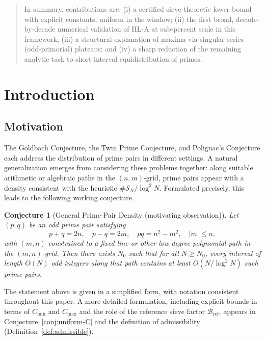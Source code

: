 \documentclass[11pt]{article}
\theoremstyle{inline}
\theoremstyle{break}
\theoremstyle{break}
\theoremstyle{break}
\theoremstyle{break}
\theoremstyle{break}
\newtheorem{conjecture}{Conjecture}
\theoremstyle{break}
\theoremstyle{break}
\theoremstyle{inline}
\newcommand{\tref}{{\scriptscriptstyle\mathrm{ref}}}
\newcommand{\Cmeas}{C}              %
\newcommand{\Bref}{\mathcal{B}_\tref}
\begin{document}
\begin{abstract}
In summary, contributions are: (i) a certified sieve-theoretic lower bound with explicit constants, uniform in the window; (ii) the first broad, decade-by-decade numerical validation of HL-A at sub-percent scale in this framework; (iii) a structural explanation of maxima via singular-series (odd-primorial) plateaus; and (iv) a sharp reduction of the remaining analytic task to short-interval equidistribution of primes.
\end{abstract}


\section{Introduction}

\subsection{Motivation}
The Goldbach Conjecture, the Twin Prime Conjecture, and Polignac’s Conjecture each address the distribution of prime pairs in different settings.  
A natural generalization emerges from considering these problems together: along suitable arithmetic or algebraic paths in the \( (n,m) \)-grid, prime pairs appear with a density consistent with the heuristic \( \#\mathcal{S}_N / \log^2 N \).  
Formulated precisely, this leads to the following working conjecture.

\begin{conjecture}[General Prime-Pair Density (motivating observation)]\label{conj:gppd}
Let \( (p,q) \) be an odd prime pair satisfying
\begin{equation}
p+q = 2n,\quad p-q = 2m,\quad pq = n^2 - m^2,\quad |m| \le n,
\end{equation}
with \( (m,n) \) constrained to a fixed line or other low-degree polynomial path in the \( (m,n) \)-grid.  
Then there exists \( N_0 \) such that for all \( N \ge N_0 \), every interval of length \( O(N) \) odd integers along that path contains at least \( O(N / \log^2 N) \) such prime pairs.
\end{conjecture}

The statement above is given in a simplified form, with notation consistent throughout this paper.  
A more detailed formulation, including explicit bounds in terms of \( \Cmeas_{\min} \) and \( \Cmeas_{\max} \) and the role of the reference sieve factor \( \Bref \), appears in Conjecture~\ref{conj:uniform-C} and the definition of admissibility (Definition~\ref{def:admissible}).
\end{document}
